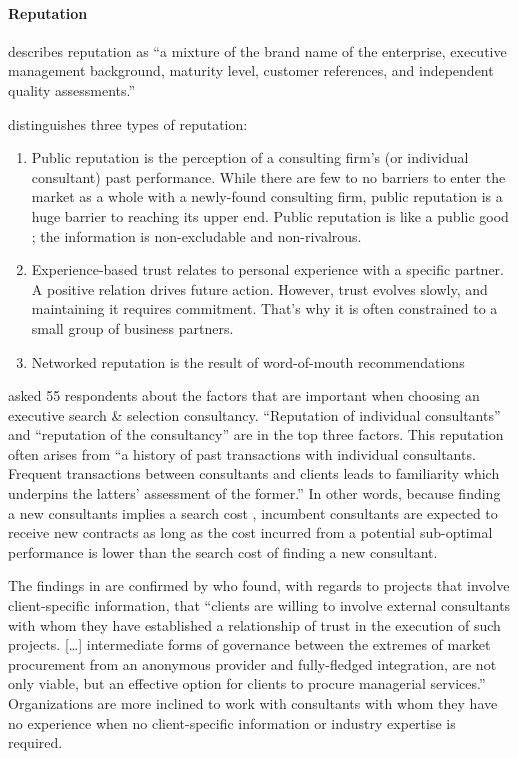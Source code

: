 \documentclass[12pt]{article}
\providecommand{\tightlist}{%
  \setlength{\itemsep}{0pt}\setlength{\parskip}{0pt}}
\begin{document}
\hypertarget{reputation}{%
\paragraph{Reputation}\label{reputation}}

\citet[193]{kirilov2012} describes reputation as ``a mixture of the
brand name of the enterprise, executive management background, maturity
level, customer references, and independent quality assessments.''

\citet[75-76]{armbruster2006} distinguishes three types of reputation:

\begin{enumerate}
\def\labelenumi{\arabic{enumi}.}
\tightlist
\item
  Public reputation is the perception of a consulting firm's (or
  individual consultant) past performance. While there are few to no
  barriers to enter the market as a whole with a newly-found consulting
  firm, public reputation is a huge barrier to reaching its upper end.
  Public reputation is like a public good ; the information is
  non-excludable and non-rivalrous.
\item
  Experience-based trust relates to personal experience with a specific
  partner. A positive relation drives future action. However, trust
  evolves slowly, and maintaining it requires commitment. That's why it
  is often constrained to a small group of business partners.
\item
  Networked reputation is the result of word-of-mouth recommendations
\end{enumerate}

\citet[243-244]{clark1993} asked 55 respondents about the factors that
are important when choosing an executive search \& selection
consultancy. ``Reputation of individual consultants'' and ``reputation
of the consultancy'' are in the top three factors. This reputation often
arises from ``a history of past transactions with individual
consultants. Frequent transactions between consultants and clients leads
to familiarity which underpins the latters' assessment of the former.''
In other words, because finding a new consultants implies a search cost
\citep[ 1072]{wilson2012}, incumbent consultants are expected to receive
new contracts as long as the cost incurred from a potential sub-optimal
performance is lower than the search cost of finding a new consultant.

The findings in \citet{clark1993} are confirmed by
\citet[285]{richter2009} who found, with regards to projects that
involve client-specific information, that ``clients are willing to
involve external consultants with whom they have established a
relationship of trust in the execution of such projects. {[}\ldots{]}
intermediate forms of governance between the extremes of market
procurement from an anonymous provider and fully-fledged integration,
are not only viable, but an effective option for clients to procure
managerial services.'' Organizations are more inclined to work with
consultants with whom they have no experience when no client-specific
information or industry expertise is required.
\end{document}
